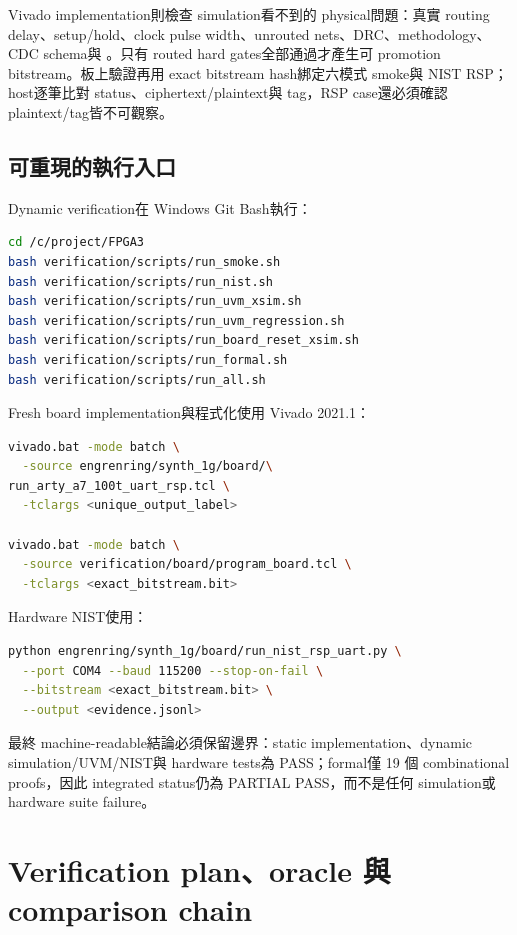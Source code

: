 \documentclass[UTF8,fontset=none,11pt,a4paper]{ctexrep}
\newcommand{\code}[1]{\texttt{\detokenize{#1}}}
\begin{document}
Vivado implementation則檢查 simulation看不到的 physical問題：真實 routing delay、setup/hold、clock pulse width、unrouted nets、DRC、methodology、CDC schema與 \code{check_timing}。只有 routed hard gates全部通過才產生可 promotion bitstream。板上驗證再用 exact bitstream hash綁定六模式 smoke與 NIST RSP；host逐筆比對 status、ciphertext/plaintext與 tag，RSP \code{FAIL} case還必須確認 plaintext/tag皆不可觀察。

\subsection{可重現的執行入口}

Dynamic verification在 Windows Git Bash執行：

\begin{lstlisting}[language=bash]
cd /c/project/FPGA3
bash verification/scripts/run_smoke.sh
bash verification/scripts/run_nist.sh
bash verification/scripts/run_uvm_xsim.sh
bash verification/scripts/run_uvm_regression.sh
bash verification/scripts/run_board_reset_xsim.sh
bash verification/scripts/run_formal.sh
bash verification/scripts/run_all.sh
\end{lstlisting}

Fresh board implementation與程式化使用 Vivado 2021.1：

\begin{lstlisting}[language=bash]
vivado.bat -mode batch \
  -source engrenring/synth_1g/board/\
run_arty_a7_100t_uart_rsp.tcl \
  -tclargs <unique_output_label>

vivado.bat -mode batch \
  -source verification/board/program_board.tcl \
  -tclargs <exact_bitstream.bit>
\end{lstlisting}

Hardware NIST使用：

\begin{lstlisting}[language=bash]
python engrenring/synth_1g/board/run_nist_rsp_uart.py \
  --port COM4 --baud 115200 --stop-on-fail \
  --bitstream <exact_bitstream.bit> \
  --output <evidence.jsonl>
\end{lstlisting}

最終 machine-readable結論必須保留邊界：static implementation、dynamic simulation/UVM/NIST與 hardware tests為 PASS；formal僅 19 個 combinational proofs，因此 integrated status仍為 PARTIAL PASS，而不是任何 simulation或 hardware suite failure。

\section{Verification plan、oracle 與 comparison chain}
\end{document}
